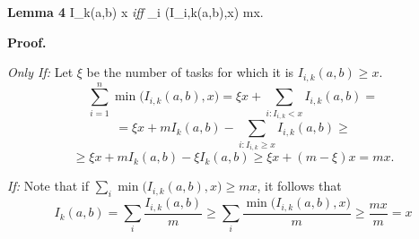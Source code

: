 \textbf{Lemma 4} \quad I_k(a,b) \geq x \quad \textit{iff} \quad \sum_i \min\bigl(I_{i,k}(a,b),x\bigr) \geq mx.

\bigskip

\noindent
\textbf{Proof.}

\bigskip

\noindent
\textit{Only If:} Let $\xi$ be the number of tasks for which it is $I_{i,k}(a,b) \geq x$.
\[
\sum_{i=1}^{n} \min\bigl(I_{i,k}(a,b),x\bigr)
=
\xi x + \sum_{i:I_{i,k}<x} I_{i,k}(a,b)
=
\]
\[
=
\xi x + mI_k(a,b) - \sum_{i:I_{i,k}\geq x} I_{i,k}(a,b)
\geq
\]
\[
\geq
\xi x + mI_k(a,b) - \xi I_k(a,b)
\geq
\xi x + (m-\xi)x
=
mx.
\]

\noindent
\textit{If:} Note that if $\sum_i \min\bigl(I_{i,k}(a,b),x\bigr) \geq mx$, it follows that
\[
I_k(a,b)
=
\sum_i \frac{I_{i,k}(a,b)}{m}
\geq
\sum_i \frac{\min\bigl(I_{i,k}(a,b),x\bigr)}{m}
\geq
\frac{mx}{m}
=
x
\]